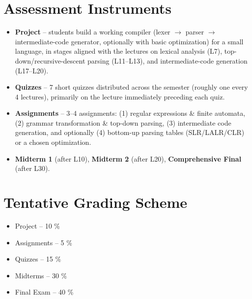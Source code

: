 \documentclass{article}
\begin{document}
\normalsize

\section*{Assessment Instruments}
\begin{itemize}
    \item \textbf{Project} -- students build a working compiler (lexer $\to$ parser $\to$ intermediate-code generator, optionally with basic optimization) for a small language, in stages aligned with the lectures on lexical analysis (L7), top-down/recursive-descent parsing (L11--L13), and intermediate-code generation (L17--L20).
    \item \textbf{Quizzes} -- 7 short quizzes distributed across the semester (roughly one every 4 lectures), primarily on the lecture immediately preceding each quiz.
    \item \textbf{Assignments} -- 3--4 assignments: (1) regular expressions \& finite automata, (2) grammar transformation \& top-down parsing, (3) intermediate code generation, and optionally (4) bottom-up parsing tables (SLR/LALR/CLR) or a chosen optimization.
    \item \textbf{Midterm 1} (after L10), \textbf{Midterm 2} (after L20), \textbf{Comprehensive Final} (after L30).
\end{itemize}

\section*{Tentative Grading Scheme}
\begin{itemize}
    \item Project -- 10 \%
    \item Assignments  -- 5 \%
    \item Quizzes -- 15 \%
    \item  Midterms -- 30 \%
    \item Final Exam -- 40 \%
\end{itemize}
\end{document}
